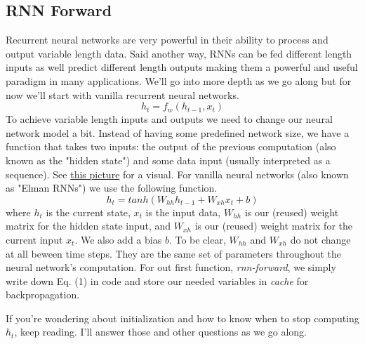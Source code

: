 \documentclass[12pt]{article}
\begin{document}
\subsection{RNN Forward}
Recurrent neural networks are very powerful in their ability to process and output 
variable length data. Said another way, RNNs can be fed different length inputs as 
well predict different length outputs making them a powerful and useful paradigm in 
many applications. We'll go into more depth as we go along but for now we'll start 
with vanilla recurrent neural networks. 
\begin{equation*}
    h_t = f_w (h_{t-1}, x_t)
\end{equation*}
To achieve variable length inputs and outputs we need to change our neural network 
model a bit. Instead of having some predefined network size, we have a function that
takes two inputs: the output of the previous computation (also known as the "hidden state")
and some data input (usually interpreted as a sequence). 
See \href{https://www.google.com/search?q=recurrent+neural+network&sxsrf=ALiCzsaznqUkAxJ_FZnLauL7_6Z3AD132g:1666096199658&source=lnms&tbm=isch&sa=X&ved=2ahUKEwizlpGB5On6AhVtmWoFHfgSCc0Q_AUoAXoECAIQAw&biw=1496&bih=1138&dpr=1.13#imgrc=iC7Ot7uyj4lzoM}
{this picture} for a visual. For vanilla neural networks (also known as "Elman RNNs") 
we use the following function. 
\begin{equation}
    h_t = tanh(W_{hh}h_{t-1} + W_{xh}x_t + b)
\end{equation}
where $h_t$ is the current state, $x_t$ is the input data, $W_{hh}$ is our (reused) 
weight matrix for the hidden state input, and $W_{xh}$ is our (reused) weight 
matrix for the current input $x_t$. We also add a bias $b$. To be clear, $W_{hh}$ and 
$W_{xh}$ do not change at all beween time steps. They are the same set of parameters 
throughout the neural network's computation. For out first function, \emph{rnn-forward}, 
we simply write down Eq. (1) in code and store our needed variables in \emph{cache} 
for backpropagation. 

If you're wondering about initialization and how to know when to stop computing $h_t$, 
keep reading. I'll answer those and other questions as we go along. 
\end{document}
